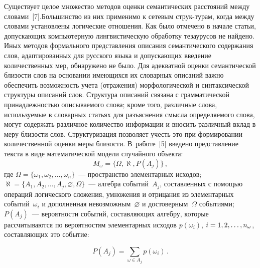 \begin{multicols}{2}
     Существует целое множество методов оценки семантических расстояний 
между словами~[7].\linebreak Большинство из них применимо к сетевым струк-\linebreak турам, 
когда между словами установлены логические отношения. Как было отмечено в 
начале \mbox{статьи}, допускающих компьютерную лингвистическую обработку 
тезаурусов не найдено. Иных методов формального представления описания 
семантического содержания слов, адаптированных для русского языка и 
допускающих введение количественных мер, обнаружено не было. Для 
адекватной оценки семантической бли\-зости слов на основании име\-ющих\-ся их 
словарных описаний важно обеспечить возможность учета (отражения) 
морфологической и синтаксической структуры описаний слов. Структура 
описаний связана с грамматической принадлежностью описываемого слова; 
кроме того, различные слова, используемые в словарных статьях для 
разъяснения смысла определяемого слова, могут содержать различное 
количество информации и вносить различный вклад в меру бли\-зости слов. 
Структуризация позволяет учесть это при формировании количественной 
оценки меры бли\-зости. В~работе~[5] введено представление текста в виде 
математической модели случайного объекта: 
     \begin{equation}
     M_\omega =\{\Omega, \aleph, P(A_j)\}\,,
     \label{e1-kuz}
     \end{equation}
где $\Omega=\{\omega_1,\omega_2, \ldots ,\omega_n\}$~--- пространство 
элементарных исходов;
$\aleph=\{A_1,A_2, \ldots , A_j, \varnothing, \Omega\}$~--- \mbox{алгебра} событий~$A_j$, 
составленных с помощью операций логического сложения, умножения и 
отрицания из элементарных событий~$\omega_i$ и дополненная 
невозможным~$\varnothing$ и достоверным~$\Omega$ событиями;\linebreak
$P(A_j)$~--- вероятности событий, составляющих алгебру, которые 
рассчитываются по вероятностям элементарных исходов $p(\omega_i)$, 
$i \hm= 1, 2, \ldots , n_\omega$, со\-став\-ля\-ющих это событие:

\vspace*{4pt}

\noindent
\begin{equation}
P(A_j)=\sum\limits_{\omega\in A_j} p(\omega_i)\,.
\label{e2-kuz}
\end{equation}

\vspace*{-2pt}






\end{multicols}
